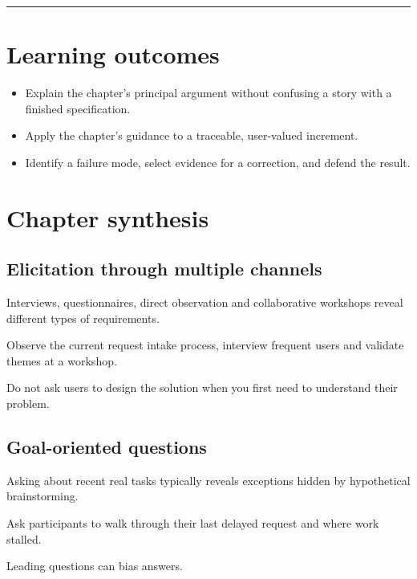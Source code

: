 \documentclass[11pt,letterpaper]{article}
\begin{document}
\tableofcontents\medskip\noindent\rule{\linewidth}{0.4pt}\medskip
\section{Learning outcomes}
\begin{itemize}[leftmargin=*,itemsep=2pt]
\item Explain the chapter's principal argument without confusing a story with a finished specification.
\item Apply the chapter's guidance to a traceable, user-valued increment.
\item Identify a failure mode, select evidence for a correction, and defend the result.
\end{itemize}
\section{Chapter synthesis}
\subsection{Elicitation through multiple channels}
Interviews, questionnaires, direct observation and collaborative workshops reveal different types of requirements.

\begin{tcolorbox}[colback=tealback,colframe=navy,title={Engineering translation},breakable]
Observe the current request intake process, interview frequent users and validate themes at a workshop.

\end{tcolorbox}
\begin{tcolorbox}[colback=amberback,colframe=navy,title={Failure mode to watch},breakable]
Do not ask users to design the solution when you first need to understand their problem.

\end{tcolorbox}
\subsection{Goal-oriented questions}
Asking about recent real tasks typically reveals exceptions hidden by hypothetical brainstorming.

\begin{tcolorbox}[colback=tealback,colframe=navy,title={Engineering translation},breakable]
Ask participants to walk through their last delayed request and where work stalled.

\end{tcolorbox}
\begin{tcolorbox}[colback=amberback,colframe=navy,title={Failure mode to watch},breakable]
Leading questions can bias answers.

\end{tcolorbox}
\end{document}
